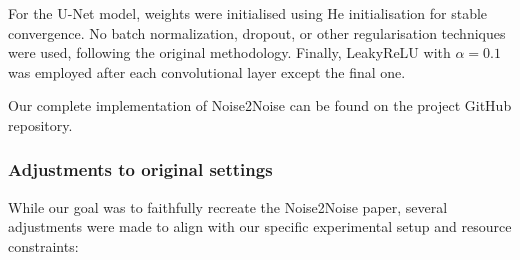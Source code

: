 For the U-Net model, weights were initialised using He initialisation \cite{he_delving_2015} for stable convergence. No batch normalization, dropout, or other regularisation techniques were used, following the original methodology. Finally, LeakyReLU with $\alpha = 0.1$ \cite{maas_rectifier_2013} was employed after each convolutional layer except the final one.

Our complete implementation of Noise2Noise can be found on the project GitHub repository.

\subsubsection{Adjustments to original settings}

While our goal was to faithfully recreate the Noise2Noise paper, several adjustments were made to align with our specific experimental setup and resource constraints:

